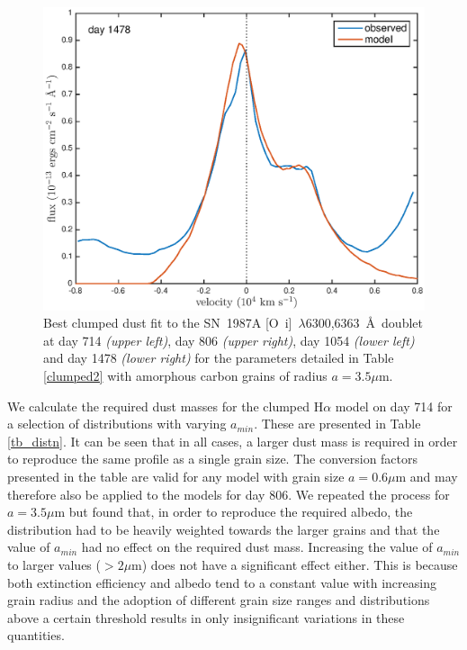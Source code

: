 \documentclass[useAMS,usenatbib,usegraphicx]{mnras}
\begin{document}
\begin{figure}
\begin{center}
\includegraphics[trim =33 10 45 15,clip=true,scale=0.47]{clump_1/maximum/d1478OI}
\caption{Best clumped dust fit to the SN~1987A [O~{\sc i}]~$\lambda$6300,6363~\AA\ doublet at day 714 \textit{(upper left)}, day 806 \textit{(upper right)}, day 1054 \textit{(lower left)} and day 1478 \textit{(lower right)} for the parameters detailed in Table \ref{clumped2} with amorphous carbon grains of radius $a=3.5 \mu$m.}
\label{OI_clump2}
\end{center}
\end{figure}

We calculate the required dust masses for the clumped H$\alpha$ model on day 714 for a selection of distributions with varying $a_{min}$.  These are presented in Table \ref{tb_distn}.  It can be seen that in all cases, a larger dust mass is required in order to reproduce the same profile as a single grain size.  The conversion factors presented in the table are valid for any model with grain size $a=0.6\mu$m and may therefore also be applied to the models for day 806.  We repeated the process for $a=3.5 \mu$m but found that, in order to reproduce the required albedo, the distribution had to be heavily weighted towards the larger grains and that the value of $a_{min}$ had no effect on the required dust mass.  Increasing the value of $a_{min}$ to larger values ($>2\mu$m) does not have a significant effect either.  This is because both extinction efficiency and albedo tend to a constant value with increasing grain radius and the adoption of different grain size ranges and distributions above a certain threshold results in only insignificant variations in these quantities. 
\end{document}

